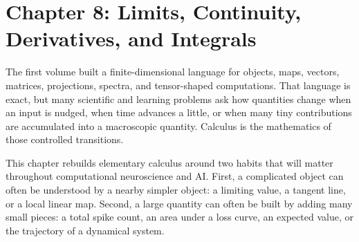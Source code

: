 \section{Chapter 8: Limits, Continuity, Derivatives, and Integrals}
\label{ch:limits-continuity-derivatives-integrals}

The first volume built a finite-dimensional language for objects, maps, vectors, matrices, projections, spectra, and tensor-shaped computations. That language is exact, but many scientific and learning problems ask how quantities change when an input is nudged, when time advances a little, or when many tiny contributions are accumulated into a macroscopic quantity. Calculus is the mathematics of those controlled transitions.

This chapter rebuilds elementary calculus around two habits that will matter throughout computational neuroscience and AI. First, a complicated object can often be understood by a nearby simpler object: a limiting value, a tangent line, or a local linear map. Second, a large quantity can often be built by adding many small pieces: a total spike count, an area under a loss curve, an expected value, or the trajectory of a dynamical system.

